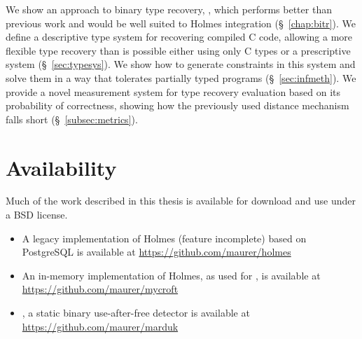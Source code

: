 We show an approach to binary type recovery, \bitr, which performs better than previous work and would be well suited to Holmes integration (\S~\ref{chap:bitr}).
We define a descriptive type system for recovering compiled C code, allowing a more flexible type recovery than is possible either using only C types or a prescriptive system (\S~\ref{sec:typesys}).
We show how to generate constraints in this system and solve them in a way that tolerates partially typed programs (\S~\ref{sec:infmeth}).
We provide a novel measurement system for type recovery evaluation based on its probability of correctness, showing how the previously used distance mechanism falls short (\S~\ref{subsec:metrics}).

\section{Availability}
Much of the work described in this thesis is available for download and use under a BSD license.
\begin{itemize}
\item A legacy implementation of Holmes (feature incomplete) based on PostgreSQL is available at \url{https://github.com/maurer/holmes}
\item An in-memory implementation of Holmes, as used for \aliasname, is available at \url{https://github.com/maurer/mycroft}
\item \aliasname, a static binary use-after-free detector is available at\\ \url{https://github.com/maurer/marduk}
\end{itemize}

